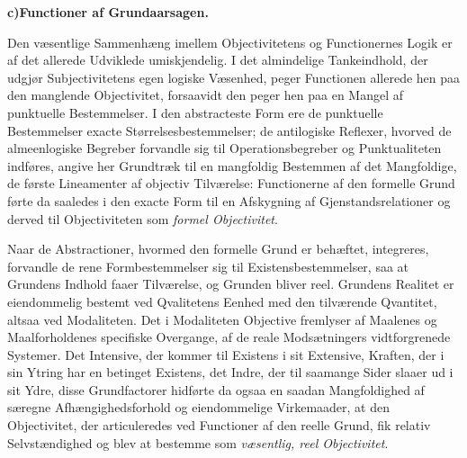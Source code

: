 \documentclass[12pt]{book}
\newcommand{\opage}[1]{\marginnote{\footnotesize\textit{[#1]}}}
\begin{document}
\begin{center}{\bfseries c)\quad Functioner af Grundaarsagen.}\end{center}

Den væsentlige Sammenhæng imellem Objectivitetens og Functionernes Logik er af det allerede
Udviklede umiskjendelig. I det almindelige Tankeindhold, der udgjør Subjectivitetens egen
logiske Væsenhed, peger Functionen allerede hen paa den manglende Objectivitet, forsaavidt den
peger hen paa en Mangel af punktuelle Bestemmelser. I den abstracteste Form ere de punktuelle
Bestemmelser exacte Størrelsesbestemmelser; de antilogiske Reflexer, hvorved de almeenlogiske
Begreber forvandle sig til Operationsbegreber og Punktualiteten indføres, angive her Grundtræk
til en mangfoldig Bestemmen af det Mangfoldige, de første Lineamenter af objectiv Tilværelse:
Functionerne af den formelle Grund førte da saaledes i den exacte Form til en Afskygning af
Gjenstandsrelationer og derved til Objectiviteten som \emph{formel Objectivitet}.

Naar de Abstractioner, hvormed den formelle Grund er
\opage{388} behæftet, integreres, forvandle de rene Formbestemmelser sig til Existensbestemmelser, saa at
Grundens Indhold faaer Tilværelse, og Grunden bliver reel. Grundens Realitet er eiendommelig
bestemt ved Qvalitetens Eenhed med den tilværende Qvantitet, altsaa ved Modaliteten. Det i
Modaliteten Objective fremlyser af Maalenes og Maalforholdenes specifiske Overgange, af de
reale Modsætningers vidtforgrenede Systemer. Det Intensive, der kommer til Existens i sit
Extensive, Kraften, der i sin Ytring har en betinget Existens, det Indre, der til saamange
Sider slaaer ud i sit Ydre, disse Grundfactorer hidførte da ogsaa en saadan Mangfoldighed af
særegne Afhængighedsforhold og eiendommelige Virkemaader, at den Objectivitet, der
articuleredes ved Functioner af den reelle Grund, fik relativ Selvstændighed og blev at
bestemme som \emph{væsentlig, reel Objectivitet}.
\end{document}
